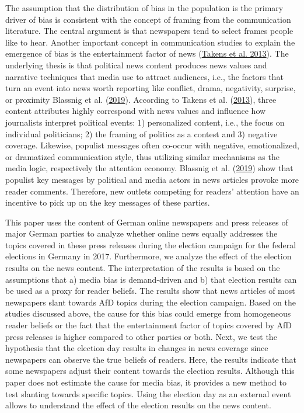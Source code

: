 \documentclass[
  12pt,
]{article}
\begin{document}
The assumption that the distribution of bias in the population is the
primary driver of bias is consistent with the concept of framing from
the communication literature. The central argument is that newspapers
tend to select frames people like to hear. Another important concept in
communication studies to explain the emergence of bias is the
entertainment factor of news
(\protect\hyperlink{ref-takens_media_2013}{Takens et al. 2013}). The
underlying thesis is that political news content produces news values
and narrative techniques that media use to attract audiences, i.e., the
factors that turn an event into news worth reporting like conflict,
drama, negativity, surprise, or proximity Blassnig et al.
(\protect\hyperlink{ref-blassnig_hitting_2019}{2019}). According to
Takens et al. (\protect\hyperlink{ref-takens_media_2013}{2013}), three
content attributes highly correspond with news values and influence how
journalists interpret political events: 1) personalized content, i.e.,
the focus on individual politicians; 2) the framing of politics as a
contest and 3) negative coverage. Likewise, populist messages often
co-occur with negative, emotionalized, or dramatized communication
style, thus utilizing similar mechanisms as the media logic,
respectively the attention economy. Blassnig et al.
(\protect\hyperlink{ref-blassnig_hitting_2019}{2019}) show that populist
key messages by political and media actors in news articles provoke more
reader comments. Therefore, new outlets competing for readers' attention
have an incentive to pick up on the key messages of these parties.

This paper uses the content of German online newspapers and press
releases of major German parties to analyze whether online news equally
addresses the topics covered in these press releases during the election
campaign for the federal elections in Germany in 2017. Furthermore, we
analyze the effect of the election results on the news content. The
interpretation of the results is based on the assumptions that a) media
bias is demand-driven and b) that election results can be used as a
proxy for reader beliefs. The results show that news articles of most
newspapers slant towards AfD topics during the election campaign. Based
on the studies discussed above, the cause for this bias could emerge
from homogeneous reader beliefs or the fact that the entertainment
factor of topics covered by AfD press releases is higher compared to
other parties or both. Next, we test the hypothesis that the election
day results in changes in news coverage since newspapers can observe the
true beliefs of readers. Here, the results indicate that some newspapers
adjust their content towards the election results. Although this paper
does not estimate the cause for media bias, it provides a new method to
test slanting towards specific topics. Using the election day as an
external event allows to understand the effect of the election results
on the news content.
\end{document}
